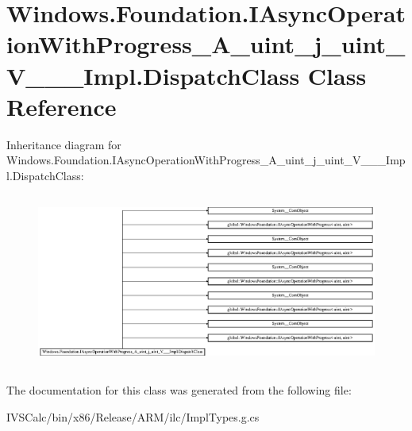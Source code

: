 \hypertarget{class_windows_1_1_foundation_1_1_i_async_operation_with_progress___a__uint__j__uint___v_______impl_1_1_dispatch_class}{}\section{Windows.\+Foundation.\+I\+Async\+Operation\+With\+Progress\+\_\+\+A\+\_\+uint\+\_\+j\+\_\+uint\+\_\+\+V\+\_\+\+\_\+\+\_\+\+Impl.\+Dispatch\+Class Class Reference}
\label{class_windows_1_1_foundation_1_1_i_async_operation_with_progress___a__uint__j__uint___v_______impl_1_1_dispatch_class}
Inheritance diagram for Windows.\+Foundation.\+I\+Async\+Operation\+With\+Progress\+\_\+\+A\+\_\+uint\+\_\+j\+\_\+uint\+\_\+\+V\+\_\+\+\_\+\+\_\+\+Impl.\+Dispatch\+Class\+:\begin{figure}[H]
\begin{center}
\leavevmode
\includegraphics[height=5.767790cm]{class_windows_1_1_foundation_1_1_i_async_operation_with_progress___a__uint__j__uint___v_______impl_1_1_dispatch_class}
\end{center}
\end{figure}


The documentation for this class was generated from the following file\+:\begin{DoxyCompactItemize}
\item 
I\+V\+S\+Calc/bin/x86/\+Release/\+A\+R\+M/ilc/Impl\+Types.\+g.\+cs\end{DoxyCompactItemize}
